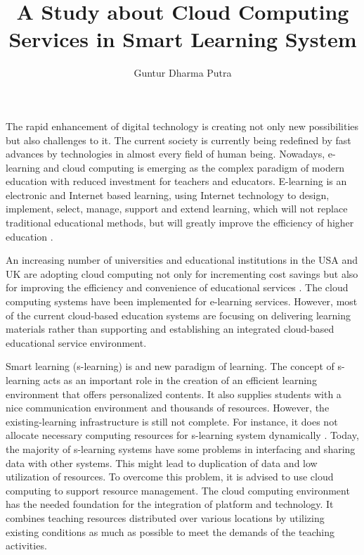 \documentclass[journal]{vgtc}
\title{A Study about Cloud Computing Services in Smart Learning System}
\author{Guntur Dharma Putra}
\begin{document}
\maketitle

The rapid enhancement of digital technology is creating not only new possibilities but also challenges to it. The current society is currently being redefined by fast advances by technologies in almost every field of human being. Nowadays, e-learning and cloud computing is emerging as the complex paradigm of modern education with reduced investment for teachers and educators. E-learning is an electronic and Internet based learning, using Internet technology to design, implement, select, manage, support and extend learning, which will not replace traditional educational methods, but will greatly improve the efficiency of higher education \cite{SudhirKumarSharmaNidhiGoyal2014}.

An increasing number of universities and educational institutions in the USA and UK are adopting cloud computing not only for incrementing cost savings but also for improving the efficiency and convenience of educational services \cite{jeong2013cloud}. The cloud computing systems have been implemented for e-learning services. However, most of the current cloud-based education systems are focusing on delivering learning materials rather than supporting and establishing an integrated cloud-based educational service environment.

Smart learning (s-learning) is and new paradigm of learning. The concept of s-learning acts as an important role in the creation of an efficient learning environment that offers personalized contents. It also supplies students with a nice communication environment and thousands of resources. However, the existing-learning infrastructure is still not complete. For instance, it does not allocate necessary computing resources for s-learning system dynamically \cite{Uden2007}. Today, the majority of s-learning systems have some problems in interfacing and sharing data with other systems. This might lead to duplication of data and low utilization of resources. To overcome this problem, it is advised to use cloud computing to support resource management. The cloud computing environment has the needed foundation for the integration of platform and technology. It combines teaching resources distributed over various locations by utilizing existing conditions as much as possible to meet the demands of the teaching activities.
\end{document}
